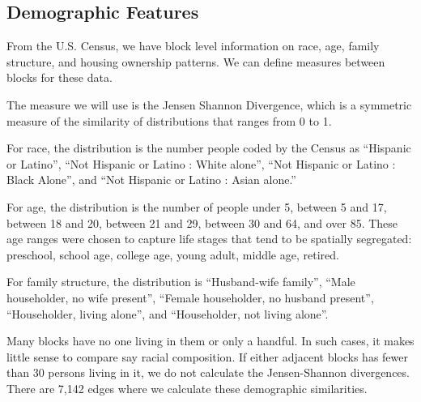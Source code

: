 \documentclass[12pt,letter]{article}\usepackage[]{graphicx}\usepackage[]{color}
\begin{document}
\subsection*{Demographic Features}



From the U.S. Census, we have block level information on race, age,
family structure, and housing ownership patterns. We can define
measures between blocks for these data. 

The measure we will use is the Jensen Shannon Divergence, which is a
symmetric measure of the similarity of distributions that ranges from
0 to 1. 

For race, the distribution is the number people coded by the Census as
``Hispanic or Latino'', ``Not Hispanic or Latino : White alone'',
``Not Hispanic or Latino : Black Alone'', and ``Not Hispanic or Latino
: Asian alone.'' 

For age, the distribution is the number of people
under 5, between 5 and 17, between 18 and 20, between 21 and 29,
between 30 and 64, and over 85. These age ranges were chosen to
capture life stages that tend to be spatially segregated: preschool,
school age, college age, young adult, middle age, retired. 

For family structure, the distribution is ``Husband-wife family'',
``Male householder, no wife present'', ``Female householder, no
husband present'', ``Householder, living alone'', and ``Householder,
not living alone''.

Many blocks have no one living in them or only a handful. In such
cases, it makes little sense to compare say racial composition. If
either adjacent blocks has fewer than 30 persons living in it, we do
not calculate the Jensen-Shannon divergences. There are
7,142 edges where we calculate these
demographic similarities.
\end{document}
